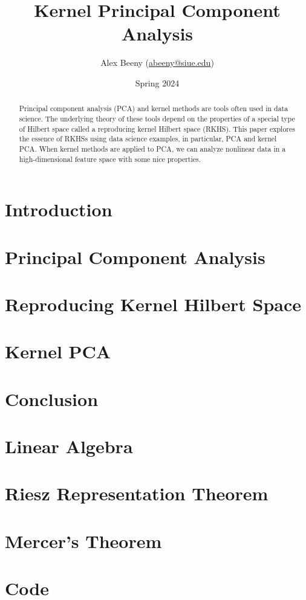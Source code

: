 \documentclass{article}
\title{Kernel Principal Component Analysis}
\author{Alex Beeny (\url{abeeny@siue.edu})}
\date{Spring 2024}
\theoremstyle{definition}
\begin{document}
\maketitle
\tableofcontents
\begin{abstract}
    Principal component analysis (PCA) and kernel methods are tools often used in data science.
    The underlying theory of these tools depend on the properties of a special type of Hilbert space called a reproducing kernel Hilbert space (RKHS).
    This paper explores the essence of RKHSs using data science examples, in particular, PCA and kernel PCA.
    When kernel methods are applied to PCA, we can analyze nonlinear data in a high-dimensional feature space with some nice properties.
\end{abstract}
\section{Introduction}

\section{Principal Component Analysis}

\section{Reproducing Kernel Hilbert Space}

\section{Kernel PCA}

\section{Conclusion}

\appendix
\section{Linear Algebra}

\section{Riesz Representation Theorem}

\section{Mercer's Theorem}

\section{Code}


\nocite{*}


\end{document}
